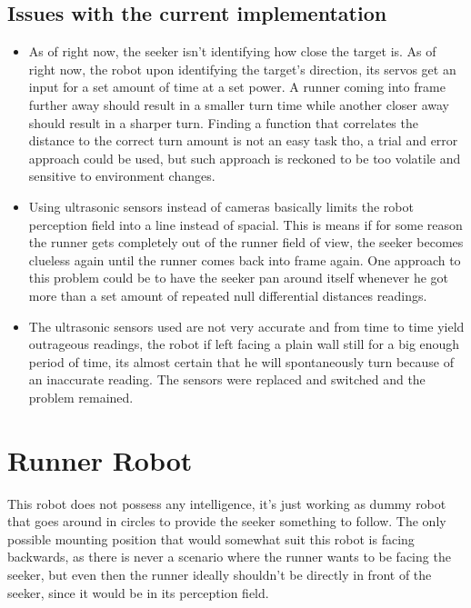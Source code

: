 \documentclass[sigconf,nonacm]{acmart}
\begin{document}
\subsection{Issues with the current implementation}
\begin{itemize}
      \item 
      As of right now, the seeker isn't identifying how close the target is. As of
      right now, the robot upon identifying the target's direction, its servos get an
      input for a set amount of time at a set power. A runner coming into frame
      further away should result in a smaller turn time while another closer away
      should result in a sharper turn.
      Finding a function that correlates the distance to the correct turn amount
      is not an easy task tho, a trial and error approach could be used, but
      such approach is reckoned to be too volatile and sensitive to environment changes.

      \item Using ultrasonic sensors instead of cameras basically limits the
      robot perception field into a line instead of spacial. This is means if for
      some reason the runner gets completely out of the runner field of view,
      the seeker becomes clueless again until the runner comes back into frame
      again.
      One approach to this problem could be to have the seeker pan around itself
      whenever he got more than a set amount of repeated null differential
      distances readings.

      \item The ultrasonic sensors used are not very accurate and from time to
      time yield outrageous readings, the robot if left facing a plain wall
      still for a big enough period of time, its almost certain that he will
      spontaneously turn because of an inaccurate reading. The sensors were
      replaced and switched and the problem remained.
\end{itemize}



\section{Runner Robot}

This robot does not possess any intelligence, it's just working as dummy robot
that goes around in circles to provide the seeker something to follow. The only
possible mounting position that would somewhat suit this robot is facing
backwards, as there is never a scenario where the runner wants to be facing the
seeker, but even then the runner ideally shouldn't be directly in front of the 
seeker, since it would be in its perception field. 
\end{document}
